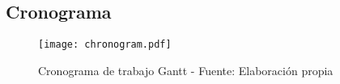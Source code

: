 \begin{landscape}
\subsection{Cronograma}
\centering
	\begin{figure}
        \caption{Cronograma de trabajo Gantt - Fuente: Elaboración propia} \label{fig:chronogram}
		\texttt{[image: chronogram.pdf]}
	\end{figure}
\end{landscape}

